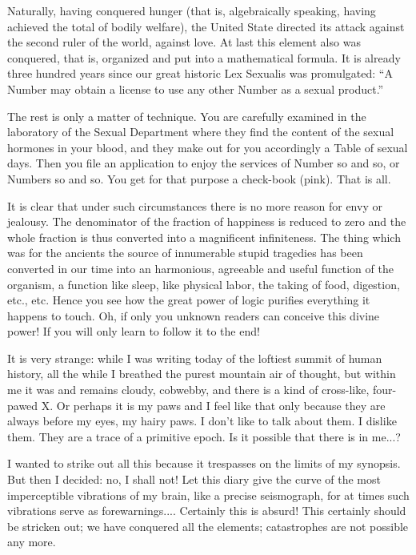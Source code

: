 \documentclass[11pt,openany]{book}
\begin{document}
Naturally, having conquered hunger (that is, algebraically speaking, having achieved the total of bodily welfare), the United State directed its attack against the second ruler of the world, against love. At last this element also was conquered, that is, organized and put into a mathematical formula. It is already three hundred years since our great historic Lex Sexualis was promulgated: ``A Number may obtain a license to use any other Number as a sexual product.''

The rest is only a matter of technique. You are carefully examined in the laboratory of the Sexual Department where they find the content of the sexual hormones in your blood, and they make out for you accordingly a Table of sexual days. Then you file an application to enjoy the services of Number so and so, or Numbers so and so. You get for that purpose a check-book (pink). That is all.

It is clear that under such circumstances there is no more reason for envy or jealousy. The denominator of the fraction of happiness is reduced to zero and the whole fraction is thus converted into a magnificent infiniteness. The thing which was for the ancients the source of innumerable stupid tragedies has been converted in our time into an harmonious, agreeable and useful function of the organism, a function like sleep, like physical labor, the taking of food, digestion, etc., etc. Hence you see how the great power of logic purifies everything it happens to touch. Oh, if only you unknown readers can conceive this divine power! If you will only learn to follow it to the end!

It is very strange: while I was writing today of the loftiest summit of human history, all the while I breathed the purest mountain air of thought, but within me it was and remains cloudy, cobwebby, and there is a kind of cross-like, four-pawed X. Or perhaps it is my paws and I feel like that only because they are always before my eyes, my hairy paws. I don't like to talk about them. I dislike them. They are a trace of a primitive epoch. Is it possible that there is in me...?

I wanted to strike out all this because it trespasses on the limits of my synopsis. But then I decided: no, I shall not! Let this diary give the curve of the most imperceptible vibrations of my brain, like a precise seismograph, for at times such vibrations serve as forewarnings.... Certainly this is absurd! This certainly should be stricken out; we have conquered all the elements; catastrophes are not possible any more.
\end{document}
